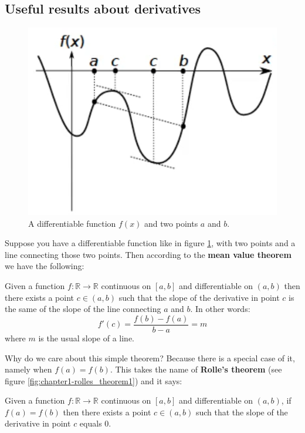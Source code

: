 \subsection{Useful results about derivatives}
\begin{figure}
    \centering
    \includegraphics[scale=0.3]{figures/1/chapter1-mean_value_theorem1.png}
    \caption{A differentiable function $f(x)$ and two points $a$ and $b$.}
    \label{fig:chapter1-mean_value_theorem1}
\end{figure}
\par Suppose you have a differentiable function like in figure \ref{fig:chapter1-mean_value_theorem1}, with two points and a line connecting those two points. Then according to the \textbf{mean value theorem} we have the following:
\begin{theorem}
    Given a function $f : \mathbb{R} \rightarrow \mathbb{R}$ continuous on $[a,b]$ and differentiable on $(a,b)$ then there exists a point $c \in (a,b)$ such that the slope of the derivative in point $c$ is the same of the slope of the line connecting $a$ and $b$. In other words:
    \[
        f'(c) = \frac{f(b)-f(a)}{b-a} = m
    \]
    where $m$ is the usual slope of a line.
\end{theorem}
Why do we care about this simple theorem? Because there is a special case of it, namely when $f(a) = f(b)$. This takes the name of \textbf{Rolle's theorem} (see figure \ref{fig:chapter1-rolles_theorem1}) and it says:
\begin{theorem}
    Given a function $f : \mathbb{R} \rightarrow \mathbb{R}$ continuous on $[a,b]$ and differentiable on $(a,b)$, if $f(a) = f(b)$ then there exists a point $c \in (a,b)$ such that the slope of the derivative in point $c$ equals 0.
\end{theorem}
